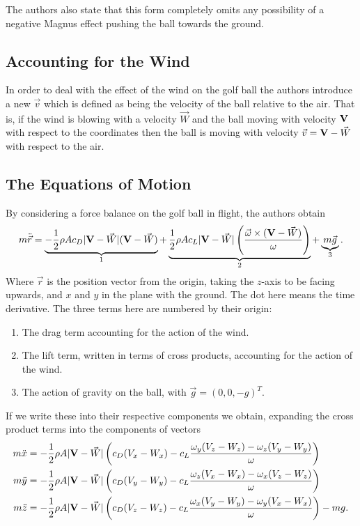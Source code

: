 The authors also state that this form completely omits any possibility of a negative Magnus effect 
pushing the ball towards the ground.

\subsection{Accounting for the Wind}

In order to deal with the effect of the wind on the golf ball the authors introduce a new $\vec{v}$
which is defined as being the velocity of the ball relative to the air. That is, if the wind is blowing
with a velocity $\vec{W}$ and the ball moving with velocity $\mathbf{V}$ with respect to the coordinates then
the ball is moving with velocity $\vec{v} = \mathbf{V} - \vec{W}$ with respect to the air.

\subsection{The Equations of Motion}

By considering a force balance on the golf ball in flight, the authors obtain
\begin{equation}
m \ddot{\vec{r}} = \underbrace{- \frac{1}{2}\rho A c_D |\mathbf{V} - \vec{W}|(\mathbf{V} - \vec{W})}_{1} + \underbrace{\frac{1}{2} \rho A c_L
|\mathbf{V} - \vec{W}| \left(\frac{\vec{\omega} \times (\mathbf{V} - \vec{W})}{\omega}\right)}_{2} + \underbrace{m \vec{g}}_{3} .
\end{equation}
Where $\vec{r}$ is the position vector from the origin, taking the $z$-axis to be facing upwards, and $x$ and $y$ in the plane with the ground. The dot here means the time derivative. 
The three terms here are numbered by their origin:
\begin{enumerate}
\item The drag term accounting for the action of the wind.
\item The lift term, written in terms of cross products, accounting for the action of
the wind.
\item The action of gravity on the ball, with $\vec{g} = (0,0,-g)^{T}$.
\end{enumerate}

If we write these into their respective components we obtain, expanding the cross product terms into
the components of vectors
\begin{subequations}
\begin{align}
m \ddot{x} &= -\frac{1}{2} \rho A |\mathbf{V} - \vec{W}| \left(c_D (V_x - W_x) - c_L \frac{\omega_y (V_z - W_z)
- \omega_z (V_y - W_y)}{\omega} \right) \\
m \ddot{y} &= -\frac{1}{2} \rho A |\mathbf{V} - \vec{W}| \left(c_D (V_y - W_y) - c_L \frac{\omega_z (V_x - W_x)
- \omega_x (V_z - W_z)}{\omega} \right) \\
m \ddot{z} &= -\frac{1}{2} \rho A |\mathbf{V} - \vec{W}| \left(c_D (V_z - W_z) - c_L \frac{\omega_x (V_y - W_y)
- \omega_y (V_x - W_x)}{\omega} \right) - mg .
\end{align}
\end{subequations}

